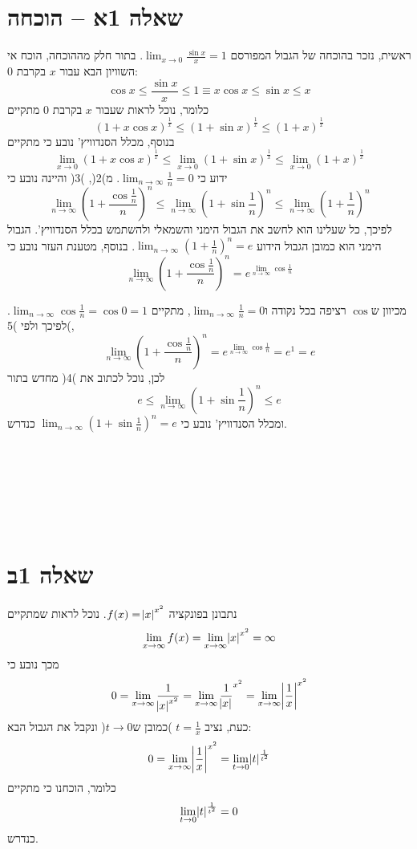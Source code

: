 \documentclass[11pt, oneside]{article}
\newcommand{\qed}{\R{$\blacksquare$}}
\newcommand{\br}{\\\\\\\\\\\\\\}
\begin{document}
\section*{שאלה 1א -- הוכחה}
ראשית, נזכר בהוכחה של הגבול המפורסם $\lim_{x \to 0} \frac{\sin{x}}{x} = 1$. בתור חלק מההוכחה, הוכח אי השוויון הבא עבור $x$ בקרבת 0:
\[
\cos{x} \le \frac{\sin{x}}{x} \le 1 \equiv x\cos{x} \le \sin{x} \le x
\]
כלומר, נוכל לראות שעבור $x$ בקרבת 0 מתקיים
\begin{equation}
(1 + x\cos{x})^{\frac{1}{x}}
\le (1 + \sin{x})^{\frac{1}{x}}
\le (1 + x)^{\frac{1}{x}}
\end{equation}
בנוסף, מכלל הסנדוויץ' נובע כי מתקיים
\begin{equation}
\lim_{x \to 0} (1 + x\cos{x})^{\frac{1}{x}}
\le \lim_{x \to 0} (1 + \sin{x})^{\frac{1}{x}}
\le \lim_{x \to 0} (1 + x)^{\frac{1}{x}}
\end{equation}
ידוע כי $\lim_{n \to \infty} \frac{1}{n} = 0$. מ)2(, )3( והיינה נובע כי
\begin{equation}
\lim_{n \to \infty} \left(1 + \frac{\cos{\frac{1}{n}}}{n}\right)^{n}
\le \lim_{n \to \infty} \left(1 + \sin{\frac{1}{n}}\right)^{n}
\le \lim_{n \to \infty} \left(1 + \frac{1}{n}\right)^{n}
\end{equation}
לפיכך, כל שעלינו הוא לחשב את הגבול הימני והשמאלי ולהשתמש בכלל הסנדוויץ'. הגבול הימני הוא כמובן הגבול הידוע $\lim_{n \to \infty} \left(1 + \frac{1}{n}\right)^{n} = e$. בנוסף, מטענת העזר נובע כי
\begin{equation}
\lim_{n \to \infty} \left(1 + \frac{\cos{\frac{1}{n}}}{n}\right)^{n} = e^{\lim_{n \to \infty} \cos{\frac{1}{n}}}
\end{equation}

מכיוון ש$\cos$ רציפה בכל נקודה ו$\lim_{n \to \infty} \frac{1}{n} = 0$, מתקיים $\lim_{n \to \infty} \cos{\frac{1}{n}} = \cos{0} = 1$. לפיכך ולפי )5(,
\[
\lim_{n \to \infty} \left(1 + \frac{\cos{\frac{1}{n}}}{n}\right)^{n} = e^{\lim_{n \to \infty} \cos{\frac{1}{n}}} = e^{1} = e
\]
לכן, נוכל לכתוב את )4( מחדש בתור
\[
e \le \lim_{n \to \infty} \left(1 + \sin{\frac{1}{n}}\right)^{n} \le e
\]
ומכלל הסנדוויץ' נובע כי $\lim_{n \to \infty} \left(1 + \sin{\frac{1}{n}}\right)^{n} = e$ כנדרש.
\br\qed

\section*{שאלה 1ב}
נתבונן בפונקציה $f(x) = \abs{x}^{x^{2}}$. נוכל לראות שמתקיים
\[
\lim_{x \to \infty} f(x)
= \lim_{x \to \infty} \abs{x}^{x^{2}}
= \infty
\]
מכך נובע כי
\[
0 = \lim_{x \to \infty} \frac{1}{\abs{x}^{x^{2}}}
= \lim_{x \to \infty} \frac{1}{\abs{x}}^{x^{2}}
= \lim_{x \to \infty} \abs{\frac{1}{x}}^{x^{2}}
\]
כעת, נציב $t = \frac{1}{x}$ )כמובן ש$t \to 0$( ונקבל את הגבול הבא:
\[
0 = \lim_{x \to \infty} \abs{\frac{1}{x}}^{x^{2}}
= \lim_{t \to 0} \abs{t}^{\frac{1}{t^{2}}}
\]
כלומר, הוכחנו כי מתקיים
\[
\lim_{t \to 0} \abs{t}^{\frac{1}{t^{2}}} = 0
\]
כנדרש.
\br\qed
\clearpage
\end{document}
